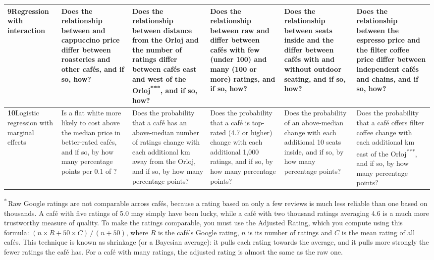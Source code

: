 \documentclass[11pt,a4paper]{article}
\begin{document}
\begin{landscape}
{\begin{longtable}{@{}>{\RaggedRight\arraybackslash}p{3.0cm}*{5}{>{\RaggedRight\arraybackslash}p{3.85cm}}@{}}
\midrule[\lightrulewidth]
\textbf{9}\enspace Regression with interaction & Does the relationship between \AR{} and cappuccino price differ between roasteries and other caf\'es, and if so, how? & Does the relationship between distance from the Orloj and the number of ratings differ between caf\'es east and west of the Orloj\textsuperscript{***}, and if so, how? & Does the relationship between raw and \AR{} differ between caf\'es with few (under 100) and many (100 or more) ratings, and if so, how? & Does the relationship between seats inside and the \PL{} differ between caf\'es with and without outdoor seating, and if so, how? & Does the relationship between the espresso price and the filter coffee price differ between independent caf\'es and chains, and if so, how? \\
\midrule[\lightrulewidth]
\textbf{10}\enspace Logistic regression with marginal effects & Is a flat white more likely to cost above the median price in better-rated caf\'es, and if so, by how many percentage points per 0.1 of \AR{}? & Does the probability that a caf\'e has an above-median number of ratings change with each additional km away from the Orloj, and if so, by how many percentage points? & Does the probability that a caf\'e is top-rated (4.7 or higher) change with each additional 1,000 ratings, and if so, by how many percentage points? & Does the probability of an above-median \PL{} change with each additional 10 seats inside, and if so, by how many percentage points? & Does the probability that a caf\'e offers filter coffee change with each additional km east of the Orloj\textsuperscript{***}, and if so, by how many percentage points? \\
\midrule[\lightrulewidth]
\end{longtable}
}

{\footnotesize
\noindent\textsuperscript{*}\,Raw Google ratings are not comparable across caf\'es, because a rating based on only a few reviews is much less reliable than one based on thousands. A caf\'e with five ratings of 5.0 may simply have been lucky, while a caf\'e with two thousand ratings averaging 4.6 is a much more trustworthy measure of quality. To make the ratings comparable, you must use the Adjusted Rating, which you compute using this formula: $(n \times R + 50 \times C)\,/\,(n + 50)$, where $R$ is the caf\'e's Google rating, $n$ is its number of ratings and $C$ is the mean rating of all caf\'es. This technique is known as shrinkage (or a Bayesian average): it pulls each rating towards the average, and it pulls more strongly the fewer ratings the caf\'e has. For a caf\'e with many ratings, the adjusted rating is almost the same as the raw one.

}
\end{landscape}
\end{document}
